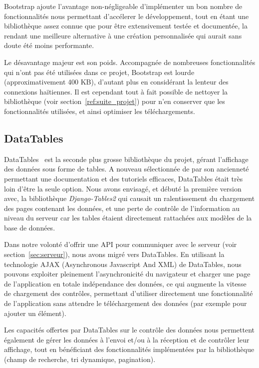\documentclass{EPL-master-thesis-covers-FR}
\begin{document}
				Bootstrap ajoute l'avantage non-négligeable d'implémenter un bon nombre de fonctionnalités nous permettant d'accélerer le développement, tout en étant une bibliothèque assez connue que pour être extensivement testée et documentée, la rendant une meilleure alternative à une création personnalisée qui aurait sans doute été moins performante.

				Le désavantage majeur est son poids. Accompagnée de nombreuses fonctionnalités qui n'ont pas été utilisées dans ce projet, Bootstrap est lourde (approximativement 400 KB), d'autant plus en considérant la lenteur des connexions haïtiennes. Il est cependant tout à fait possible de nettoyer la bibliothèque (voir section~\ref{ref:suite_projet}) pour n'en conserver que les fonctionnalités utilisées, et ainsi optimiser les téléchargements.

			\subsection*{DataTables}

				DataTables~\cite{ref:datatables} est la seconde plus grosse bibliothèque du projet, gérant l'affichage des données sous forme de tables. A nouveau sélectionnée de par son ancienneté permettant une documentation et des tutoriels efficaces, DataTables était très loin d'être la seule option. Nous avons envisagé, et débuté la première version avec, la bibliothèque \emph{Django-Tables2} qui causait un ralentissement du chargement des pages contenant les données, et une perte de contrôle de l'information au niveau du serveur car les tables étaient directement rattachées aux modèles de la base de données.

				Dans notre volonté d'offrir une API pour communiquer avec le serveur (voir section~\ref{sec:serveur}), nous avons migré vers DataTables. En utilisant la technologie AJAX (Asynchronous Javascript And XML) de DataTables, nous pouvons exploiter pleinement l'asynchronicité du navigateur et charger une page de l'application en totale indépendance des données, ce qui augmente la vitesse de chargement des contrôles, permettant d'utiliser directement une fonctionnalité de l'application sans attendre le téléchargement des données (par exemple pour ajouter un élément).

				Les capacités offertes par DataTables sur le contrôle des données nous permettent également de gérer les données à l'envoi et/ou à la réception et de contrôler leur affichage, tout en bénéficiant des fonctionnalités implémentées par la bibliothèque (champ de recherche, tri dynamique, pagination).
\end{document}
